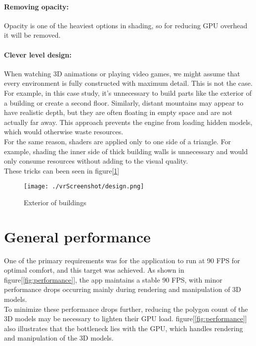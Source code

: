 \paragraph{Removing opacity:}
Opacity is one of the heaviest options in shading, so for reducing GPU overhead it will be removed.

\paragraph{Clever level design:}
When watching 3D animations or playing video games, we might assume that every environment is fully constructed with maximum detail.
This is not the case. For example, in this case study, it's unnecessary to build parts like the exterior of a building or create a second floor.
Similarly, distant mountains may appear to have realistic depth, but they are often floating in empty space and are not actually far away.
This approach prevents the engine from loading hidden models, which would otherwise waste resources.\\
For the same reason, shaders are applied only to one side of a triangle.
For example, shading the inner side of thick building walls is unnecessary and would only consume resources without adding to the visual quality.\\
These tricks can been seen in figure[\ref{fig:design}]



\begin{figure}[ht]
  \centering
  \texttt{[image: ./vrScreenshot/design.png]}
  \caption{Exterior of buildings}
  \label{fig:design}
\end{figure}

\section{General performance}
\noindent
One of the primary requirements was for the application to run at 90 \ac{FPS} for optimal comfort, and this target was achieved. As shown in figure[\ref{fig:performance}],
the app maintains a stable 90 \ac{FPS}, with minor performance drops occurring mainly during rendering and manipulation of 3D models.\\
To minimize these performance drops further, reducing the polygon count of the 3D models may be necessary to lighten their GPU load.
figure[\ref{fig:performance}] also illustrates that the bottleneck lies with the GPU, which handles rendering and manipulation of the 3D models.

